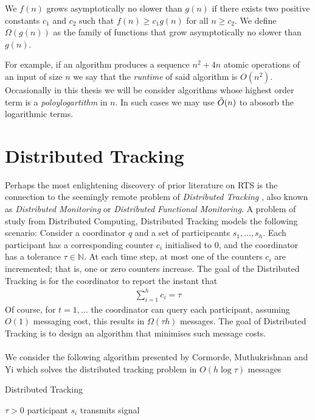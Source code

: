 \begin{definition}
    We $f(n)$ grows asymptotically no slower than $g(n)$ if there exists two positive constants $c_1$ and $c_2$ such that $f(n)\geq c_1 g(n)$ for all $n\geq c_2$. We define $\Omega(g(n))$ as the family of functions that grow asymptotically no slower than $g(n)$.
\end{definition}
For example, if an algorithm produces a sequence $n^2+4n$ atomic operations of an input of size $n$ we say that the \textit{runtime} of said algorithm is $O(n^2)$. Occasionally in this thesis we will be consider algorithms whose highest order term is a \textit{poloylogartithm} in $n$. In such cases we may use $\Tilde{O}(n)$ to abosorb the logarithmic terms. 

\newpage

\section{Distributed Tracking}

Perhaps the most enlightening discovery of prior literature on RTS is the connection to the seemingly remote problem of \textit{Distributed Tracking} \cite{Cormode2011}, also known as \textit{Distributed Monitoring} or \textit{Distributed Functional Monitoring}. A problem of study from Distributed Computing, Distributed Tracking models the following scenario: Consider a coordinator $q$ and a set of participcants $s_1, \dots, s_h$. Each participant has a corresponding counter $c_i$ initialised to 0, and the coordinator has a tolerance $\tau\in\mathbb{N}$. At each time step, at most one of the counters $c_i$ are incremented; that is, one or zero counters increase.  The goal of the Distributed Tracking is for the coordinator to report the instant that 
\begin{align}
    \sum_{i=1}^{h}c_i = \tau
\end{align}
Of course, for $t=1,\dots$ the coordinator can query each participant, assuming $O(1)$ messaging cost, this results in  $\Omega(\tau h)$ messages. The goal of Distributed Tracking is to design an algorithm that minimises such message costs. \\
\\
We consider the following algorithm presented by Cormorde, Muthukrishnan and Yi \cite{Cormode} which solves the distributed tracking problem in $O(h\log \tau)$ messages

\begin{algorithm}
\caption{Distributed Tracking }\label{Algorithm 1}
\begin{algorithmic}
\Require $\tau > 0$
    \State {}
    \State {} 
    \State {}
     
            \State participant $s_i$ transmits signal
        \EndIf
    \EndFor
\EndIf
\end{algorithmic}
\end{algorithm}


